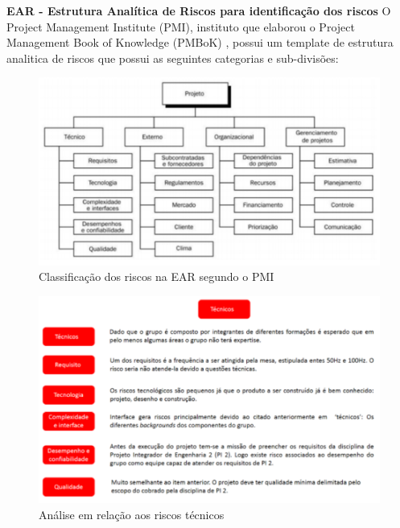 		\textbf{EAR - Estrutura Analítica de Riscos para identificação dos riscos}
		O Project Management Institute (PMI), instituto que elaborou o Project Management Book of Knowledge (PMBoK) \cite{pmbok2012}, possui um template de estrutura analitica de riscos que possui as seguintes categorias e sub-divisões: 
		
		\graphicspath{{figuras/}}
		\begin{figure}[h!]
			\centering
			\includegraphics[scale=0.80]{classificacao_de_riscos.png}
			\caption{Classificação dos riscos na EAR segundo o PMI}
			\label{img:classificacao_de_riscos}
		\end{figure}
		
		\graphicspath{{figuras/}}
		\begin{figure}[h!]
			\centering
			\includegraphics[scale=0.80]{analise_riscos_tecnicos.png}
			\caption{Análise em relação aos riscos técnicos}
			\label{img:analise_riscos_tecnicos}
		\end{figure}
		
